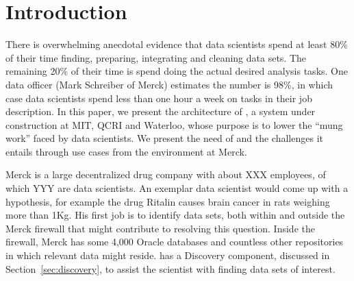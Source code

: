 \section{Introduction}
\label{introduction}

There is overwhelming anecdotal evidence that data scientists spend at least 80\%
of their time finding, preparing, integrating and cleaning data sets.
The remaining 20\% of their time is spend doing the actual desired 
analysis tasks.
One data officer (Mark Schreiber of
Merck) estimates the number is 98\%, in which case data scientists spend less
than one hour a week on tasks in their job description.
%
In this paper, we present the architecture of \dcv, a system under
construction at MIT, QCRI and Waterloo, whose purpose is to lower the ``mung work''  faced by data scientists.  
We present the need of \dcv and the challenges it entails
through use cases from the environment at Merck.

%
%

Merck is a large decentralized drug company with about XXX employees, of which
YYY are data scientists.  An exemplar data scientist would come up with a
hypothesis, for example the drug Ritalin causes brain cancer in rats weighing
more than 1Kg.  His first job is to identify data sets, both within and outside the Merck
firewall that might contribute to resolving this question.  Inside
the firewall, Merck has some 4,000 Oracle databases and countless other
repositories in which relevant data might reside.  \dcv has a
Discovery component, discussed in Section~\ref{sec:discovery}, 
to assist the scientist with finding data sets of interest.

